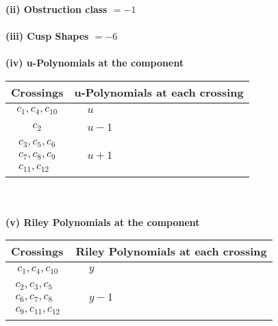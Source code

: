 \documentclass[1p]{elsarticle_modified}
\theoremstyle{definition}
\begin{document}
\flushleft \textbf{(ii) Obstruction class $= -1$}\\~\\
\flushleft \textbf{(iii) Cusp Shapes $= -6$}\\~\\
\newpage\renewcommand{\arraystretch}{1}
\flushleft \textbf{(iv) u-Polynomials at the component}\newline \\
\begin{tabular}{m{50pt}|m{274pt}}
Crossings & \hspace{64pt}u-Polynomials at each crossing \\
\hline $$\begin{aligned}c_{1},c_{4},c_{10}\end{aligned}$$&$\begin{aligned}
&u
\end{aligned}$\\
\hline $$\begin{aligned}c_{2}\end{aligned}$$&$\begin{aligned}
&u-1
\end{aligned}$\\
\hline $$\begin{aligned}c_{3},c_{5},c_{6}\\c_{7},c_{8},c_{9}\\c_{11},c_{12}\end{aligned}$$&$\begin{aligned}
&u+1
\end{aligned}$\\
\hline
\end{tabular}\\~\\
\newpage\renewcommand{\arraystretch}{1}
\flushleft \textbf{(v) Riley Polynomials at the component}\newline \\
\begin{tabular}{m{50pt}|m{274pt}}
Crossings & \hspace{64pt}Riley Polynomials at each crossing \\
\hline $$\begin{aligned}c_{1},c_{4},c_{10}\end{aligned}$$&$\begin{aligned}
&y
\end{aligned}$\\
\hline $$\begin{aligned}c_{2},c_{3},c_{5}\\c_{6},c_{7},c_{8}\\c_{9},c_{11},c_{12}\end{aligned}$$&$\begin{aligned}
&y-1
\end{aligned}$\\
\hline
\end{tabular}\\~\\
\end{document}
